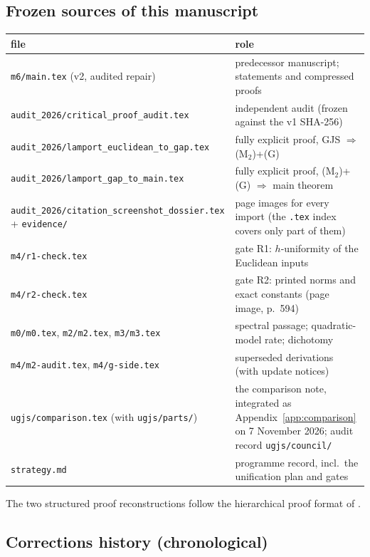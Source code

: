 \documentclass[11pt,a4paper]{article}
\theoremstyle{plain}
\theoremstyle{definition}
\theoremstyle{plain}
\theoremstyle{definition}
\begin{document}
\subsection*{Frozen sources of this manuscript}

\begin{center}
\small
\begin{tabular}{p{} p{}}
\toprule
file & role\\
\midrule
\texttt{m6/main.tex} (v2, audited repair) & predecessor manuscript; statements and compressed proofs\\
\texttt{audit\_2026/}\allowbreak\texttt{critical\_proof\_audit.tex} & independent audit (frozen against the v1 SHA-256)\\
\texttt{audit\_2026/}\allowbreak\texttt{lamport\_euclidean\_to\_gap.tex} & fully explicit proof, GJS $\Rightarrow$ (M$_2$)+(G)\\
\texttt{audit\_2026/}\allowbreak\texttt{lamport\_gap\_to\_main.tex} & fully explicit proof, (M$_2$)+(G) $\Rightarrow$ main theorem\\
\texttt{audit\_2026/}\allowbreak\texttt{citation\_screenshot\_dossier.tex} + \texttt{evidence/} & page images for every import (the \texttt{.tex} index covers only part of them)\\
\texttt{m4/r1-check.tex} & gate R1: $h$-uniformity of the Euclidean inputs\\
\texttt{m4/r2-check.tex} & gate R2: printed norms and exact constants (page image, p.~594)\\
\texttt{m0/m0.tex}, \texttt{m2/m2.tex}, \texttt{m3/m3.tex} & spectral passage; quadratic-model rate; dichotomy\\
\texttt{m4/m2-audit.tex}, \texttt{m4/g-side.tex} & superseded derivations (with update notices)\\
\texttt{ugjs/comparison.tex} (with \texttt{ugjs/}\allowbreak\texttt{parts/}) & the comparison note, integrated as Appendix~\ref{app:comparison} on 7 November 2026; audit record \texttt{ugjs/}\allowbreak\texttt{council/}\\
\texttt{strategy.md} & programme record, incl.\ the unification plan and gates\\
\bottomrule
\end{tabular}
\end{center}

The two structured proof reconstructions follow the hierarchical proof format of
\cite{Lamport}.

\subsection*{Corrections history (chronological)}
\end{document}
